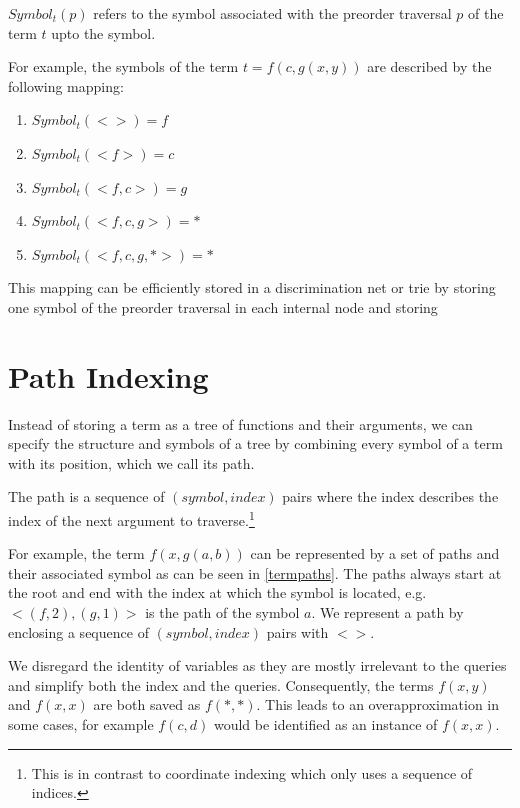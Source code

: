 \begin{defn}
  $Symbol_{t}(p)$ refers to the symbol associated with the preorder traversal $p$ of the term $t$ upto the symbol.
\end{defn}

For example, the symbols of the term $t = f(c,g(x,y))$ are described by the following mapping:
\begin{enumerate}
\item $Symbol_{t}(<>) = f$
\item $Symbol_{t}(<f>) = c$
\item $Symbol_{t}(<f,c>) = g$
\item $Symbol_{t}(<f,c,g>) = *$
\item $Symbol_{t}(<f,c,g,*>) = *$
\end{enumerate}

This mapping can be efficiently stored in a discrimination net or trie by storing one symbol of the preorder traversal in each internal node and storing


\section{Path Indexing}
Instead of storing a term as a tree of functions and their arguments, we can specify the structure and symbols of a tree by combining every symbol of a term with its position, which we call its path.
\begin{defn}
  The path is a sequence of $(symbol, index)$ pairs where the index describes the index of the next argument to traverse.\footnote{This is in contrast to coordinate indexing which only uses a sequence of indices.}
\end{defn}
For example, the term $f(x,g(a,b))$ can be represented by a set of paths and their associated symbol as can be seen in \cref{termpaths}.
The paths always start at the root and end with the index at which the symbol is located, e.g. $<(f,2), (g,1)>$ is the path of the symbol $a$. We represent a path by enclosing a sequence of $(symbol, index)$ pairs with $<>$. 

We disregard the identity of variables as they are mostly irrelevant to the queries and simplify both the index and the queries. Consequently, the terms $f(x,y)$ and $f(x,x)$ are both saved as $f(*,*)$. This leads to an overapproximation in some cases, for example $f(c,d)$ would be identified as an instance of $f(x,x)$.

